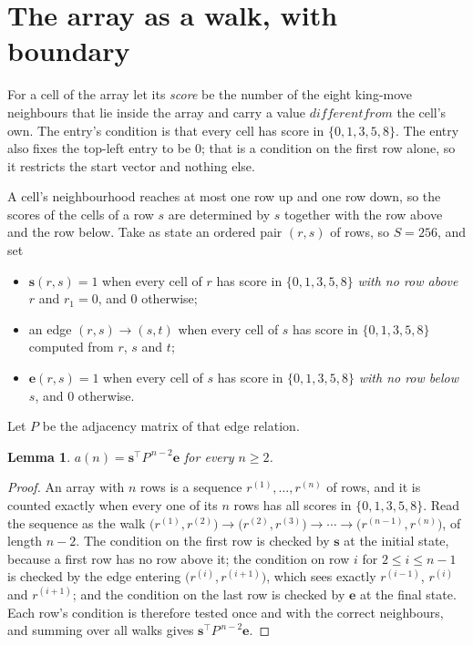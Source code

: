 \documentclass[11pt,a4paper]{article}
\theoremstyle{plain}
\newtheorem{lemma}[theorem]{Lemma}
\theoremstyle{definition}
\begin{document}
\section{The array as a walk, with boundary}

For a cell of the array let its \emph{score} be the number of the eight king-move neighbours that lie inside
the array and carry a value $different from$ the cell's own. The entry's condition is that every cell
has score in $\{0,1,3,5,8\}$. The entry also fixes the top-left entry to be $0$; that is a condition on the first row alone, so it restricts the start vector and nothing else.

A cell's neighbourhood reaches at most one row up and one row down, so the scores of the
cells of a row $s$ are determined by $s$ together with the row above and the row below.
Take as state an ordered pair $(r,s)$ of rows, so $S=256$, and set
\begin{itemize}
\item $\mathbf{s}(r,s)=1$ when every cell of $r$ has score in $\{0,1,3,5,8\}$ \emph{with no row
above $r$} and $r_1=0$, and $0$ otherwise;
\item an edge $(r,s)\to(s,t)$ when every cell of $s$ has score in $\{0,1,3,5,8\}$ computed from
$r$, $s$ and $t$;
\item $\mathbf{e}(r,s)=1$ when every cell of $s$ has score in $\{0,1,3,5,8\}$ \emph{with no row
below $s$}, and $0$ otherwise.
\end{itemize}
Let $P$ be the adjacency matrix of that edge relation.

\begin{lemma}\label{lem:walk}
$a(n)=\mathbf{s}^{\!\top}P^{\,n-2}\mathbf{e}$ for every $n\ge2$.
\end{lemma}

\begin{proof}
An array with $n$ rows is a sequence $r^{(1)},\dots,r^{(n)}$ of rows, and it is counted
exactly when every one of its $n$ rows has all scores in $\{0,1,3,5,8\}$. Read the sequence as the
walk $\bigl(r^{(1)},r^{(2)}\bigr)\to\bigl(r^{(2)},r^{(3)}\bigr)\to\cdots\to
\bigl(r^{(n-1)},r^{(n)}\bigr)$, of length $n-2$. The condition on the first row is
checked by $\mathbf{s}$ at the initial state, because a first row has no row above it; the
condition on row $i$ for $2\le i\le n-1$ is checked by the edge entering
$\bigl(r^{(i)},r^{(i+1)}\bigr)$, which sees exactly $r^{(i-1)}$, $r^{(i)}$ and
$r^{(i+1)}$; and the condition on the last row is checked by $\mathbf{e}$ at the final
state. Each row's condition is therefore tested once and with the correct neighbours, and
summing over all walks gives $\mathbf{s}^{\!\top}P^{\,n-2}\mathbf{e}$.
\end{proof}
\end{document}
